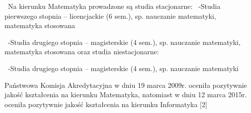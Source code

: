 \documentclass[a4paper,12pt]{article}
\begin{document}
\ 
Na kierunku Matematyka prowadzone są studia stacjonarne:
\ 
-Studia pierwszego stopnia – licencjackie (6 sem.), sp. nauczanie matematyki, matematyka stosowana


\ 
-Studia drugiego stopnia – magisterskie (4 sem.), sp. nauczanie matematyki, matematyka stosowana
oraz studia niestacjonarne:

\ 
-Studia drugiego stopnia – magisterskie (4 sem.), sp. nauczanie matematyki
\ 
\ 
\ 

Państwowa Komisja Akredytacyjna w dniu 19 marca 2009r. oceniła pozytywnie jakość kształcenia na kierunku
Matematyka, natomiast w dniu 12 marca 2015r. oceniła pozytywnie jakość kształcenia na kierunku
Informatyka [2]
\end{document}
